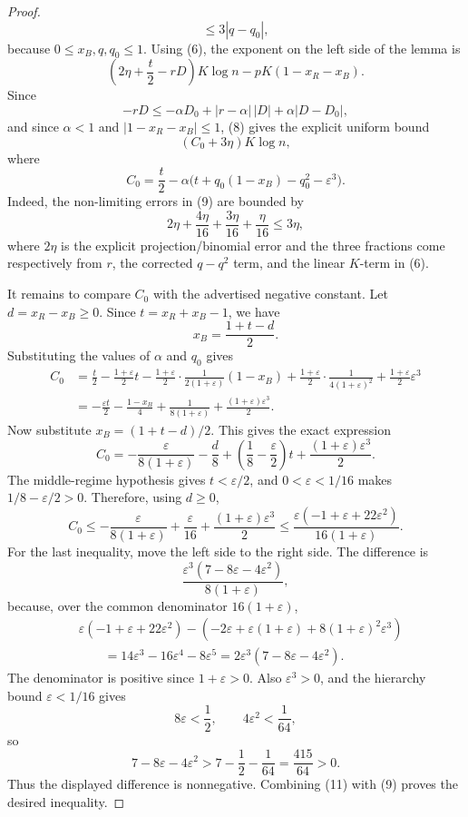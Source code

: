 \begin{proof}
\[\le 3|q-q_0|,
\]
because \(0\le x_B,q,q_0\le1\).  Using (6), the exponent on the
left side of the lemma is
\[
\left(2\eta+\frac{t}{2}-rD\right)K\log n
-pK(1-x_R-x_B).
\]
Since
\[
-rD\le -\alpha D_0
+|r-\alpha|\,|D|
+\alpha |D-D_0|,
\]
and since \(\alpha<1\) and \(|1-x_R-x_B|\le1\), (8) gives the explicit
uniform bound
\[
\left(C_0+3\eta\right)K\log n, \tag{9}
\]
where
\[
C_0=\frac{t}{2}-\alpha\bigl(t+q_0(1-x_B)-q_0^2-\varepsilon^3\bigr).
\]
Indeed, the non-limiting errors in (9) are bounded by
\[
2\eta+\frac{4\eta}{16}+\frac{3\eta}{16}+\frac{\eta}{16}
\le 3\eta,
\]
where \(2\eta\) is the explicit projection/binomial error and the three
fractions come respectively from \(r\), the corrected \(q-q^2\) term, and the
linear \(K\)-term in (6).

It remains to compare \(C_0\) with the advertised negative constant.  Let
\(d=x_R-x_B\ge0\).  Since \(t=x_R+x_B-1\), we have
\[
x_B=\frac{1+t-d}{2}.
\]
Substituting the values of \(\alpha\) and \(q_0\) gives
\[
\begin{aligned}
C_0
&=\frac t2-\frac{1+\varepsilon}{2}t
-\frac{1+\varepsilon}{2}\cdot\frac{1}{2(1+\varepsilon)}(1-x_B)
+\frac{1+\varepsilon}{2}\cdot\frac{1}{4(1+\varepsilon)^2}
+\frac{1+\varepsilon}{2}\varepsilon^3\\
&=-\frac{\varepsilon t}{2}-\frac{1-x_B}{4}
+\frac{1}{8(1+\varepsilon)}
+\frac{(1+\varepsilon)\varepsilon^3}{2}.
\end{aligned}
\]
Now substitute \(x_B=(1+t-d)/2\).  This gives the exact expression
\[
C_0
=-\frac{\varepsilon}{8(1+\varepsilon)}
-\frac d8+\left(\frac18-\frac{\varepsilon}{2}\right)t
+\frac{(1+\varepsilon)\varepsilon^3}{2}. \tag{10}
\]
The middle-regime hypothesis gives \(t<\varepsilon/2\), and
\(0<\varepsilon<1/16\) makes \(1/8-\varepsilon/2>0\).  Therefore, using
\(d\ge0\),
\[
C_0\le
-\frac{\varepsilon}{8(1+\varepsilon)}
+\frac{\varepsilon}{16}
+\frac{(1+\varepsilon)\varepsilon^3}{2}
\le
\frac{\varepsilon(-1+\varepsilon+22\varepsilon^2)}
     {16(1+\varepsilon)}. \tag{11}
\]
For the last inequality, move the left side to the right side.  The difference
is
\[
\frac{\varepsilon^3(7-8\varepsilon-4\varepsilon^2)}
     {8(1+\varepsilon)},
\]
because, over the common denominator \(16(1+\varepsilon)\),
\[
\begin{aligned}
&\varepsilon(-1+\varepsilon+22\varepsilon^2)
-\left(-2\varepsilon+\varepsilon(1+\varepsilon)
  +8(1+\varepsilon)^2\varepsilon^3\right)\\
&\qquad =
14\varepsilon^3-16\varepsilon^4-8\varepsilon^5
=2\varepsilon^3(7-8\varepsilon-4\varepsilon^2).
\end{aligned}
\]
The denominator is positive since \(1+\varepsilon>0\).  Also
\(\varepsilon^3>0\), and the hierarchy bound \(\varepsilon<1/16\) gives
\[
8\varepsilon<\frac12,\qquad
4\varepsilon^2<\frac1{64},
\]
so
\[
7-8\varepsilon-4\varepsilon^2
>
7-\frac12-\frac1{64}
=\frac{415}{64}>0.
\]
Thus the displayed difference is nonnegative.  Combining (11) with (9)
proves the desired inequality.
\end{proof}
